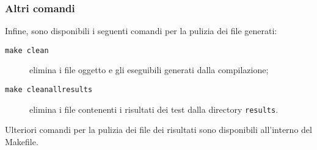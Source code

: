         
    \subsubsection*{Altri comandi}

        Infine, sono disponibili i seguenti comandi per la pulizia dei file generati:
        \begin{description}
            \item[\texttt{make clean}] elimina i file oggetto e gli eseguibili generati dalla compilazione;
            \item[\texttt{make cleanallresults}] elimina i file contenenti i risultati dei test dalla directory \texttt{results}.
        \end{description}

        Ulteriori comandi per la pulizia dei file dei risultati sono disponibili all'interno del Makefile.
